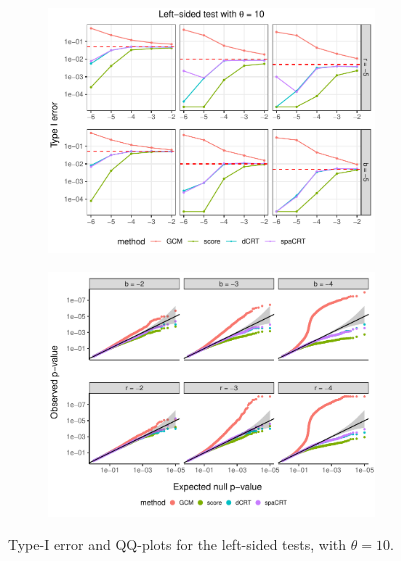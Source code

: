 \documentclass[12pt]{article}
\theoremstyle{definition}
\begin{document}
\begin{figure}
  \centering
  \begin{subfigure}{\textwidth}
    \centering
    \includegraphics[width=0.95\textwidth]{figures-and-tables/simulation/Type-I-error/plot-bin-NB-normal-B-50000-n-5000-5e3-n5-n5-disp-10-Type-I-error-LEFT.pdf}
  \end{subfigure}

  \begin{subfigure}{\textwidth}
    \centering
    \includegraphics[width=0.95\textwidth]{figures-and-tables/simulation/QQ/plot-bin-NB-normal-B-50000-n-5000-5e3-n5-n5-disp-10-QQ-LEFT.pdf}
  \end{subfigure}
  \caption{Type-I error and QQ-plots for the left-sided tests, with $\theta = 10$.}
  \label{fig:simulation-Type-I-error-LEFT-10}
\end{figure}
\end{document}
